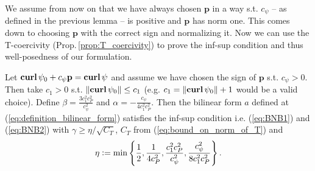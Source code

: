 \documentclass[../master_thesis.tex]{subfiles}
\begin{document}
We assume from now on that we have always chosen $\mathbf{p}$ in a way s.t. 
$c_\psi$ -- as defined in the previous lemma -- is positive and $\mathbf{p}$ has 
norm one. This comes down to choosing $\mathbf{p}$ with the correct sign and normalizing it. 
Now we can use the T-coercivity (Prop.\,\ref{prop:T_coercivity}) to prove the inf-sup condition and thus 
well-posedness of our formulation.

\begin{theorem}
    Let $\veccurl \psi_0 + c_\psi \mathbf{p} = \veccurl \psi$ and assume we have chosen the sign of 
    $\mathbf{p}$ s.t. $c_\psi > 0$. Then take $c_1 >0 $ s.t. 
    $\lVert \veccurl \psi_0 \rVert \leq c_1$ (e.g. $c_1 = \lVert \veccurl \psi_0 \rVert + 1$ would be a valid choice). Define 
    $\beta = \frac{3 c_1^2 c_P^2}{c_\psi^2}$ and $\alpha = -\frac{c_\psi}{4 c_1^2 c_P^2}$. 
    Then the bilinear form $a$ defined at (\ref{eq:definition_bilinear_form}) 
    satisfies the inf-sup condition i.e. (\ref{eq:BNB1}) and (\ref{eq:BNB2})
    with $\gamma \geq \eta/\sqrt{C_T}$, $C_T$ from (\ref{eq:bound_on_norm_of_T})
    and 
    \begin{align*}
        \eta \vcentcolon= \min \left\{ \frac{1}{2},  \frac{1}{4 c_P^2}, \frac{c_1^2 c_P^2}{c_\psi^2},
        \frac{c_\psi^2}{8 c_1^2 c_P^2}\right\}.
    \end{align*}
\end{theorem}
\end{document}
